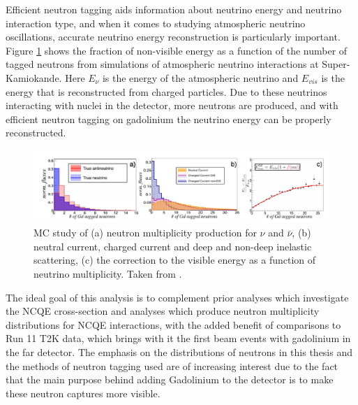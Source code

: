 Efficient neutron tagging aids information about neutrino energy and neutrino interaction type, and when it comes to studying atmospheric neutrino oscillations, accurate neutrino energy reconstruction is particularly important. Figure \ref{fig:atm_nu_energy} shows the fraction of non-visible energy as a function of the number of tagged neutrons from simulations of atmospheric neutrino interactions at Super-Kamiokande. Here $E_{\nu}$ is the energy of the atmospheric neutrino and $E_{vis}$ is the energy that is reconstructed from charged particles. Due to these neutrinos interacting with nuclei in the detector, more neutrons are produced, and with efficient neutron tagging on gadolinium the neutrino energy can be properly reconstructed. 

\begin{figure}
    \includegraphics[width=\textwidth]{Figures/atm_recon_energy.png}
\caption{MC study of (a) neutron multiplicity production for $\nu$ and ${\bar{\nu}}$, (b) neutral current, charged current and deep and non-deep inelastic scattering, (c) the correction to the visible energy as a function of neutrino multiplicity. Taken from \cite{marti_evaluation_2020}.}
\label{fig:atm_nu_energy}
\end{figure}



The ideal goal of this analysis is to complement prior analyses which investigate the NCQE cross-section and analyses which produce neutron multiplicity distributions for NCQE interactions, with the added benefit of comparisons to Run 11 T2K data, which brings with it the first beam events with gadolinium in the far detector. The emphasis on the distributions of neutrons in this thesis and the methods of neutron tagging used are of increasing interest due to the fact that the main purpose behind adding Gadolinium to the detector is to make these neutron captures more visible. 


